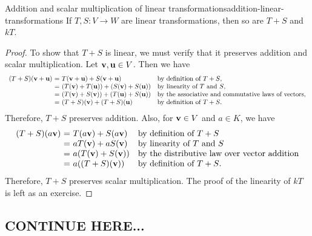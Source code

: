 \begin{proposition}{Addition and scalar multiplication of linear transformations}{addition-linear-transformations}
  If $T,S:V\to W$ are linear transformations, then so are $T+S$ and $kT$.
\end{proposition}

\begin{proof}
  To show that $T+S$ is linear, we must verify that it preserves
  addition and scalar multiplication. Let $\mbox{\bf v},\mbox{\bf u}\in
  V$. Then we have
  \begin{equation*}
    \begin{array}{r@{~}c@{~}ll}
      (T+S)(\vect{v}+\vect{u})
      &=& T(\vect{v}+\vect{u}) + S(\vect{v}+\vect{u})
      & \mbox{by definition of $T+S$,} \\
      &=& (T(\vect{v}) + T(\vect{u})) + (S(\vect{v}) + S(\vect{u}))
      & \mbox{by linearity of $T$ and $S$,} \\
      &=& (T(\vect{v}) + S(\vect{v})) + (T(\vect{u}) + S(\vect{u}))
      & \mbox{by the associative and commutative laws of vectors,} \\
      &=& (T+S)(\vect{v}) + (T+S)(\vect{u})
      & \mbox{by definition of $T+S$.}
    \end{array}
  \end{equation*}
  Therefore, $T+S$ preserves addition. Also, for $\mbox{\bf v}\in V$ and
  $a\in K$, we have
  \begin{equation*}
    \begin{array}{r@{~}c@{~}ll}
      (T+S)(a\vect{v})
      &=& T(a\vect{v}) + S(a\vect{v})
      & \mbox{by definition of $T+S$} \\
      &=& aT(\vect{v}) + aS(\vect{v})
      & \mbox{by linearity of $T$ and $S$} \\
      &=& a(T(\vect{v}) + S(\vect{v}))
      & \mbox{by the distributive law over vector addition} \\
      &=& a((T+S)(\vect{v}))
      & \mbox{by definition of $T+S$.}
    \end{array}
  \end{equation*}
  Therefore, $T+S$ preserves scalar multiplication. 
  The proof of the linearity of $kT$ is left as an exercise.
\end{proof}



\subsection{CONTINUE HERE...}

